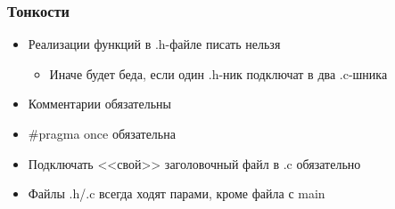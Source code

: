 \documentclass[xetex,mathserif,serif]{beamer}
\begin{document}
    \begin{frame}
        \frametitle{Тонкости}
        \begin{itemize}
            \item Реализации функций в .h-файле писать нельзя
            \begin{itemize}
                \item Иначе будет беда, если один .h-ник подключат в два .c-шника
            \end{itemize}
            \item Комментарии обязательны
            \item \#pragma once обязательна
            \item Подключать <<свой>> заголовочный файл в .c обязательно
            \item Файлы .h/.c всегда ходят парами, кроме файла с main
        \end{itemize}
    \end{frame}
\end{document}
